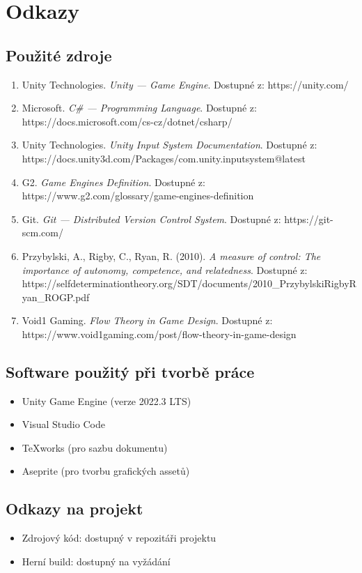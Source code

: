 \section{Odkazy}

\subsection{Použité zdroje}

\begin{enumerate}
\item Unity Technologies. \textit{Unity --- Game Engine}. Dostupné z: https://unity.com/
\item Microsoft. \textit{C\# --- Programming Language}. Dostupné z: https://docs.microsoft.com/cs-cz/dotnet/csharp/
\item Unity Technologies. \textit{Unity Input System Documentation}. Dostupné z: https://docs.unity3d.com/Packages/com.unity.inputsystem@latest
\item G2. \textit{Game Engines Definition}. Dostupné z: https://www.g2.com/glossary/game-engines-definition
\item Git. \textit{Git --- Distributed Version Control System}. Dostupné z: https://git-scm.com/
\item Przybylski, A., Rigby, C., Ryan, R. (2010). \textit{A measure of control: The importance of autonomy, competence, and relatedness}. Dostupné z: https://selfdeterminationtheory.org/SDT/documents/2010\_PrzybylskiRigbyRyan\_ROGP.pdf
\item Void1 Gaming. \textit{Flow Theory in Game Design}. Dostupné z: https://www.void1gaming.com/post/flow-theory-in-game-design
\end{enumerate}

\subsection{Software použitý při tvorbě práce}

\begin{itemize}
\item Unity Game Engine (verze 2022.3 LTS)
\item Visual Studio Code
\item TeXworks (pro sazbu dokumentu)
\item Aseprite (pro tvorbu grafických assetů)
\end{itemize}

\subsection{Odkazy na projekt}

\begin{itemize}
\item Zdrojový kód: dostupný v repozitáři projektu
\item Herní build: dostupný na vyžádání
\end{itemize}